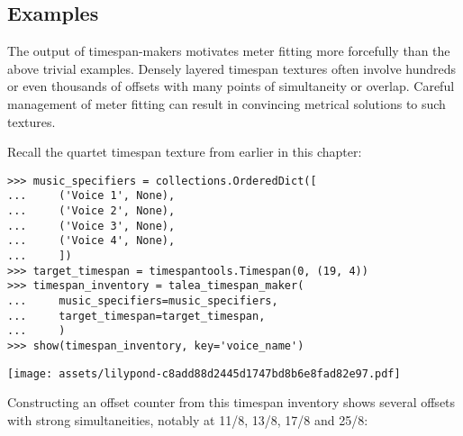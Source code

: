 \subsection{Examples}

The output of timespan-makers motivates meter fitting more forcefully than the
above trivial examples. Densely layered timespan textures often involve
hundreds or even thousands of offsets with many points of simultaneity or
overlap. Careful management of meter fitting can result in convincing metrical
solutions to such textures.

Recall the quartet timespan texture from earlier in this chapter:

\begin{comment}
<abjad>
music_specifiers = collections.OrderedDict([
    ('Voice 1', None),
    ('Voice 2', None),
    ('Voice 3', None),
    ('Voice 4', None),
    ])
target_timespan = timespantools.Timespan(0, (19, 4))
timespan_inventory = talea_timespan_maker(
    music_specifiers=music_specifiers,
    target_timespan=target_timespan,
    )
show(timespan_inventory, key='voice_name')
</abjad>
\end{comment}

\begin{abjadbookoutput}
\begin{singlespacing}
\vspace{-0.5\baselineskip}
\begin{verbatim}
>>> music_specifiers = collections.OrderedDict([
...     ('Voice 1', None),
...     ('Voice 2', None),
...     ('Voice 3', None),
...     ('Voice 4', None),
...     ])
>>> target_timespan = timespantools.Timespan(0, (19, 4))
>>> timespan_inventory = talea_timespan_maker(
...     music_specifiers=music_specifiers,
...     target_timespan=target_timespan,
...     )
>>> show(timespan_inventory, key='voice_name')
\end{verbatim}
\noindent\texttt{[image: assets/lilypond-c8add88d2445d1747bd8b6e8fad82e97.pdf]}
\end{singlespacing}
\end{abjadbookoutput}

\noindent Constructing an offset counter from this timespan inventory shows
several offsets with strong simultaneities, notably at 11/8, 13/8, 17/8 and
25/8:

\begin{comment}
<abjad>
offset_counter = metertools.OffsetCounter(timespan_inventory)
show(offset_counter, range_=(0, (19, 4)))
</abjad>
\end{comment}

